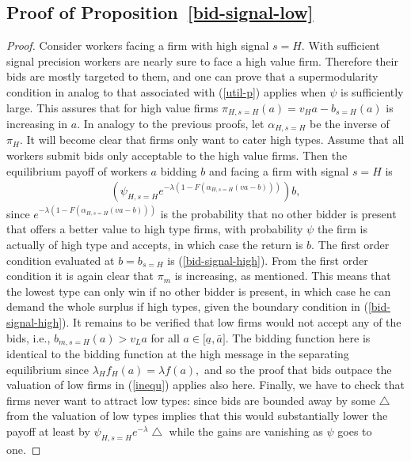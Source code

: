 \documentclass[12pt]{article}
\begin{document}
\subsection{Proof of Proposition~\ref{bid-signal-low}}

\begin{proof}
Consider workers facing a firm with high signal $s=H.$
With sufficient signal precision workers are nearly sure to face a high value firm.
Therefore their bids are mostly targeted to them, and one can prove that a supermodularity condition in analog to that associated with (\ref{util-p}) applies when $\psi $ is sufficiently large.
This assures that for high value firms $\pi _{H,s=H}(a)=v_{H}a-b_{s=H}(a)$ is increasing in $a.$
In analogy to the previous proofs, let $\alpha _{H,s=H}$ be the inverse of $\pi _{H}.$
It will become clear that firms only want to cater high types.
Assume that all workers submit bids only acceptable to the high value firms.
Then the equilibrium payoff of workers $a$ bidding $b$ and facing a firm with signal $s=H$ is 
\begin{align*}
\left( \psi _{H,s=H}e^{-\lambda (1-F(\alpha _{H,s=H}(va-b)))}\right) b,
\end{align*}
since $e^{-\lambda (1-F(\alpha _{H,s=H}(va-b)))}$ is the probability that no other bidder is present that offers a better value to high type firms, with probability $\psi $ the firm is actually of high type and accepts, in which case the return is $b.$
The first order condition evaluated at $b=b_{s=H}$ is (\ref{bid-signal-high}).
From the first order condition it is again clear that $\pi _{m}$ is increasing, as mentioned.
This means that the lowest type can only win if no other bidder is present, in which case he can demand the whole surplus if high types, given the boundary condition in (\ref{bid-signal-high}).
It remains to be verified that low firms would not accept any of the bids, i.e., $b_{m,s=H}(a)>v_{L}a$ for all $a\in \lbrack \underline{a},\bar{a}]$.
The bidding function here is identical to the bidding function at the high message in the separating equilibrium since $\lambda _{H}f_{H}(a)=\lambda f(a),$ and so the proof that bids outpace the valuation of low firms in (\ref{inequ}) applies also here.
Finally, we have to check that firms never want to attract low types: since bids are bounded away by some $\bigtriangleup $ from the valuation of low types implies that this would substantially lower the payoff at least by $\psi_{H,s=H}e^{-\lambda }\bigtriangleup $ while the gains are vanishing as $\psi$ goes to one.


\end{proof}
\end{document}
